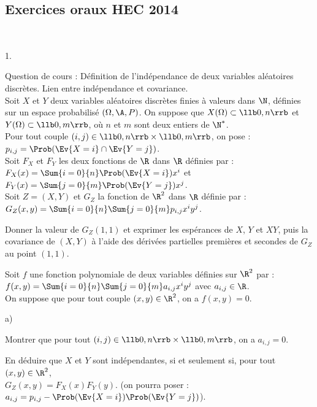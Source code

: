 \subsection*{Exercices oraux HEC 2014}


\begin{exerciceAP}~
  \begin{noliste}{1.}
    \setlength{\itemsep}{2mm}
  \item Question de cours : Définition de l'indépendance de deux
    variables aléatoires discrètes. Lien entre indépendance et
    covariance.\\
    Soit $X$ et $Y$ deux variables aléatoires discrètes finies à
    valeurs dans $\N$, définies sur un espace probabilisé
    $(\Omega,\A,P)$. On suppose que $X(\Omega)\subset \llb0,n\rrb$ et
    $Y(\Omega) \subset \llb 0, m \rrb$, où $n$ et $m$ sont deux
    entiers de $\N^*$.\\
    Pour tout couple $(i,j) \in \llb 0, n \rrb \times \llb 0, m \rrb$,
    on pose : $p_{i,j} = \Prob(\Ev{X=i} \cap \Ev{Y=j})$.\\
    Soit $F_X$ et $F_Y$ les deux fonctions de $\R$ dans $\R$ définies
    par : $F_X(x)=\Sum{i=0}{n} \Prob(\Ev{X=i})x^i$ et \\
    $F_Y(x)=\Sum{j=0}{m} \Prob(\Ev{Y=j})x^j$.\\
    Soit $Z=(X,Y)$ et $G_Z$ la fonction de $\R^2$ dans $\R$ définie
    par : $G_Z(x,y)=\Sum{i=0}{n}\Sum{j=0}{m} p_{i,j}x^iy^j$.

  \item Donner la valeur de $G_Z(1,1)$ et exprimer les espérances de
    $X$, $Y$ et $XY$, puis la covariance de $(X,Y)$ à l'aide des
    dérivées partielles premières et secondes de $G_Z$ au point
    $(1,1)$.

  \item Soit $f$ une fonction polynomiale de deux variables définies
    sur $\R^2$ par : $f(x,y) = \Sum{i=0}{n} \Sum{j=0}{m}
    a_{i,j}x^iy^j$ avec $a_{i,j} \in \R$.\\
    On suppose que pour tout couple $(x,y)\in\R^2$, on a $f(x,y)=0$.
    \begin{noliste}{a)}
    \setlength{\itemsep}{2mm}
  \item Montrer que pour tout $(i,j) \in \llb0, n \rrb \times \llb 0,
    m \rrb$, on a $a_{i,j}=0$.
    \item En déduire que $X$ et $Y$ sont indépendantes, si et
      seulement si, pour tout $(x,y)\in\R^2$,\\
      $G_Z(x,y)=F_X(x)F_Y(y)$. (on pourra poser : $a_{i,j}=p_{i,j} -
      \Prob(\Ev{X=i})\Prob(\Ev{Y=j})$).
    \end{noliste}


\end{noliste}
\end{exerciceAP}

